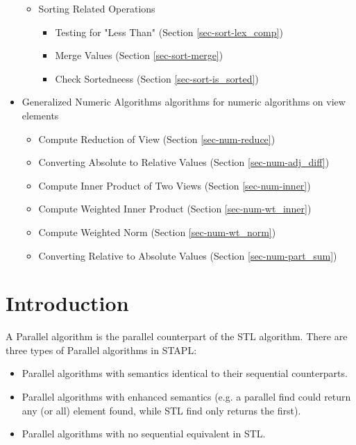\begin{itemize}
\begin{itemize}
\item 
Sorting Related Operations

\begin{itemize}
\item 
Testing for "Less Than" (Section \ref{sec-sort-lex_comp})
\item 
Merge Values (Section \ref{sec-sort-merge})
\item 
Check Sortedneess (Section \ref{sec-sort-is_sorted})
\end{itemize}

\end{itemize}

\item  
Generalized Numeric Algorithms 
algorithms for numeric algorithms on view elements

\begin{itemize}
\item 
Compute Reduction of View (Section \ref{sec-num-reduce})
\item 
Converting Absolute to Relative Values (Section \ref{sec-num-adj_diff})
\item 
Compute Inner Product of Two Views (Section \ref{sec-num-inner})
\item 
Compute Weighted Inner Product (Section \ref{sec-num-wt_inner})
\item 
Compute Weighted Norm (Section \ref{sec-num-wt_norm})
\item 
Converting Relative to Absolute Values (Section \ref{sec-num-part_sum})
\end{itemize}

\end{itemize}

 
\section{Introduction} \label{sec-intro}

A Parallel algorithm is the parallel counterpart of the STL algorithm. There are three types of Parallel algorithms in STAPL:

\begin{itemize}
\item
Parallel algorithms with semantics identical to their sequential counterparts.
\item
Parallel algorithms with enhanced semantics (e.g. a parallel find could return any (or all) element found, while STL find only returns the first).
\item
Parallel algorithms with no sequential equivalent in STL.
\end{itemize}


